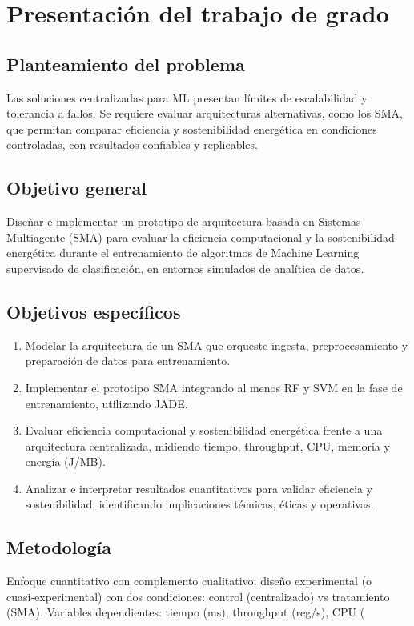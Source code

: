 \documentclass[12pt,oneside]{report}
\begin{document}
\chapter{Presentación del trabajo de grado}
\section{Planteamiento del problema}
Las soluciones centralizadas para ML presentan límites de escalabilidad y tolerancia a fallos. Se requiere evaluar arquitecturas alternativas, como los SMA, que permitan comparar eficiencia y sostenibilidad energética en condiciones controladas, con resultados confiables y replicables.

\section{Objetivo general}
Diseñar e implementar un prototipo de arquitectura basada en Sistemas Multiagente (SMA) para evaluar la eficiencia computacional y la sostenibilidad energética durante el entrenamiento de algoritmos de Machine Learning supervisado de clasificación, en entornos simulados de analítica de datos.

\section{Objetivos específicos}
\begin{enumerate}
    \item Modelar la arquitectura de un SMA que orqueste ingesta, preprocesamiento y preparación de datos para entrenamiento.
    \item Implementar el prototipo SMA integrando al menos RF y SVM en la fase de entrenamiento, utilizando JADE.
    \item Evaluar eficiencia computacional y sostenibilidad energética frente a una arquitectura centralizada, midiendo tiempo, throughput, CPU, memoria y energía (J/MB).
    \item Analizar e interpretar resultados cuantitativos para validar eficiencia y sostenibilidad, identificando implicaciones técnicas, éticas y operativas.
\end{enumerate}

\section{Metodología}
Enfoque cuantitativo con complemento cualitativo; diseño experimental (o cuasi‑experimental) con dos condiciones: control (centralizado) vs tratamiento (SMA). Variables dependientes: tiempo (ms), throughput (reg/s), CPU (%
\end{document}
